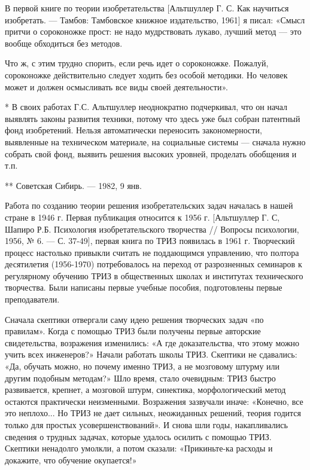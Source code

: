 В  первой  книге по  теории  изобретательства  [Альтшуллер Г.  С.  Как
научиться изобретать. — Тамбов: Тамбовское книжное издательство, 1961]
я  писал: «Смысл  притчи  о сороконожке  прост:  не надо  мудрствовать
лукаво, лучший метод — это вообще обходиться без методов.

Что ж, с  этим трудно спорить, если речь идет  о сороконожке. Пожалуй,
сороконожке  действительно  следует  ходить без  особой  методики.  Но
человек может и должен осмысливать все виды своей деятельности».

* В  своих работах  Г.С. Альтшуллер  неоднократно подчеркивал,  что он
начал  выявлять законы  развития  техники, потому  что  здесь уже  был
собран  патентный фонд  изобретений.  Нельзя автоматически  переносить
закономерности,  выявленные на  техническом  материале, на  социальные
системы —  сначала нужно  собрать свой  фонд, выявить  решения высоких
уровней, проделать обобщения и т.п.

** Советская Сибирь. — 1982, 9 янв.


Работа по  созданию теории  решения изобретательских задач  началась в
нашей  стране  в  1946  г.  Первая  публикация  относится  к  1956  г.
[Альтшуллер Г. С, Шапиро  Р.Б. Психология изобретательского творчества
//  Вопросы психологии,  1956,  №  6. —  С.  37-49],  первая книга  по
ТРИЗ  появилась  в  1961  г.  Творческий  процесс  настолько  привыкли
считать не поддающимся управлению, что полтора десятилетия (1956-1970)
потребовалось  на  переход  от разрозненных  семинаров  к  регулярному
обучению  ТРИЗ   в  общественных  школах  и   институтах  технического
творчества. Были написаны первые  учебные пособия, подготовлены первые
преподаватели.

Сначала  скептики отвергали  саму  идею решения  творческих задач  «по
правилам».  Когда  с  помощью  ТРИЗ  были  получены  первые  авторские
свидетельства,  возражения  изменились:  «А  где  доказательства,  что
этому  можно  учить  всех  инженеров?»  Начали  работать  школы  ТРИЗ.
Скептики  не сдавались:  «Да, обучать  можно, но  почему именно  ТРИЗ,
а  не  мозговому  штурму  или другим  подобным  методам?»  Шло  время,
стало очевидным:  ТРИЗ быстро развивается, крепнет,  а мозговой штурм,
синектика,  морфологический  метод остаются  практически  неизменными.
Возражения зазвучали  иначе: «Конечно, все  это неплохо... Но  ТРИЗ не
дает сильных,  неожиданных решений, теория годится  только для простых
усовершенствований».  И  снова  шли  годы,  накапливались  сведения  о
трудных  задачах, которые  удалось  осилить с  помощью ТРИЗ.  Скептики
ненадолго умолкли, а потом  сказали: «Прикиньте-ка расходы и докажите,
что обучение окупается!»

